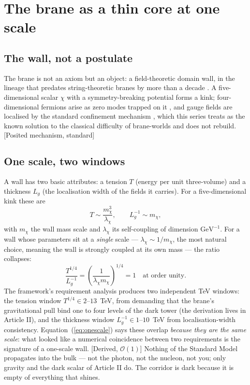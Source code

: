 \section{The brane as a thin core at one scale}
\subsection{The wall, not a postulate}
The brane is not an axiom but an object: a field-theoretic domain wall, in the lineage that predates string-theoretic branes by more than a decade \cite{RS83}. A five-dimensional scalar $\chi$ with a symmetry-breaking potential forms a kink; four-dimensional fermions arise as zero modes trapped on it \cite{RS83}, and gauge fields are localised by the standard confinement mechanism \cite{DS97}, which this series treats as the known solution to the classical difficulty of brane-worlds and does not rebuild. [Posited mechanism, standard]

\subsection{One scale, two windows}
A wall has two basic attributes: a tension $T$ (energy per unit three-volume) and a thickness $L_{g}$ (the localisation width of the fields it carries). For a five-dimensional kink these are
\begin{equation}
T\sim\frac{m_\chi^{3}}{\lambda_\chi},\qquad L_{g}^{-1}\sim m_\chi ,
\end{equation}
with $m_\chi$ the wall mass scale and $\lambda_\chi$ its self-coupling of dimension $\mathrm{GeV}^{-1}$. For a wall whose parameters sit at a \emph{single} scale --- $\lambda_\chi\sim1/m_\chi$, the most natural choice, meaning the wall is strongly coupled at its own mass --- the ratio collapses:
\begin{equation}
\frac{T^{1/4}}{L_{g}^{-1}}=\left(\frac{1}{\lambda_\chi m_\chi}\right)^{1/4}=1\quad\text{at order unity.}
\label{eq:onescale}
\end{equation}
The framework's requirement analysis produces two independent TeV windows: the tension window $T^{1/4}\in2$--$13$~TeV, from demanding that the brane's gravitational pull bind one to four levels of the dark tower (the derivation lives in Article II), and the thickness window $L_{g}^{-1}\in1$--$10$~TeV from localisation-width consistency. Equation~(\ref{eq:onescale}) says these overlap \emph{because they are the same scale}: what looked like a numerical coincidence between two requirements is the signature of a one-scale wall. [Derived, $\mathcal{O}(1)$] Nothing of the Standard Model propagates into the bulk --- not the photon, not the nucleon, not you; only gravity and the dark scalar of Article II do. The corridor is dark because it is empty of everything that shines.

